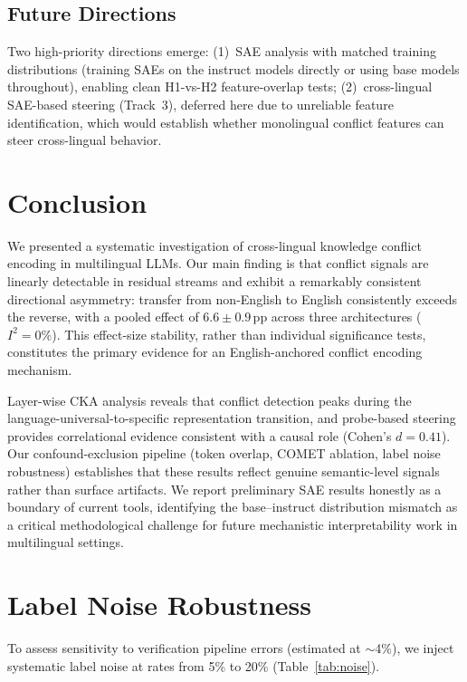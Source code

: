 \documentclass{article}
\begin{document}
\subsection{Future Directions}

Two high-priority directions emerge: (1)~SAE analysis with matched training distributions (training SAEs on the instruct models directly or using base models throughout), enabling clean H1-vs-H2 feature-overlap tests; (2)~cross-lingual SAE-based steering (Track~3), deferred here due to unreliable feature identification, which would establish whether monolingual conflict features can steer cross-lingual behavior.

\section{Conclusion}

We presented a systematic investigation of cross-lingual knowledge conflict encoding in multilingual LLMs. Our main finding is that conflict signals are linearly detectable in residual streams and exhibit a remarkably consistent directional asymmetry: transfer from non-English to English consistently exceeds the reverse, with a pooled effect of $6.6 \pm 0.9$\,pp across three architectures ($I^2 = 0\%$). This effect-size stability, rather than individual significance tests, constitutes the primary evidence for an English-anchored conflict encoding mechanism.

Layer-wise CKA analysis reveals that conflict detection peaks during the language-universal-to-specific representation transition, and probe-based steering provides correlational evidence consistent with a causal role (Cohen's $d = 0.41$). Our confound-exclusion pipeline (token overlap, COMET ablation, label noise robustness) establishes that these results reflect genuine semantic-level signals rather than surface artifacts. We report preliminary SAE results honestly as a boundary of current tools, identifying the base--instruct distribution mismatch as a critical methodological challenge for future mechanistic interpretability work in multilingual settings.

\appendix

\section{Label Noise Robustness}
\label{app:noise}

To assess sensitivity to verification pipeline errors (estimated at $\sim$4\%), we inject systematic label noise at rates from 5\% to 20\% (Table~\ref{tab:noise}).
\end{document}
